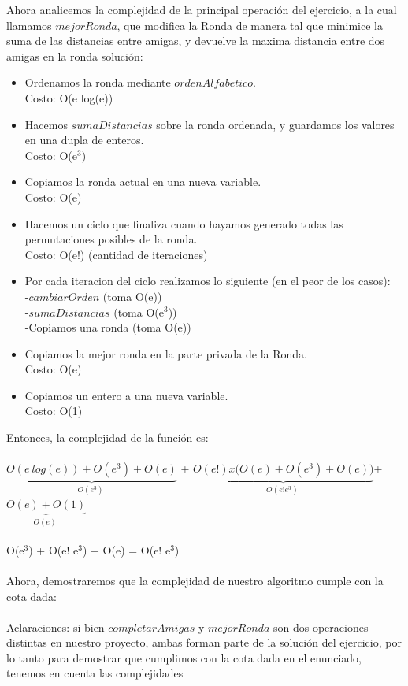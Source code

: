 Ahora analicemos la complejidad de la principal operación del ejercicio, a la cual llamamos $mejorRonda$, que modifica la Ronda de manera
tal que minimice la suma de las distancias entre amigas, y devuelve la maxima distancia entre dos amigas en la ronda solución: 
\begin{itemize}
\item Ordenamos la ronda mediante $ordenAlfabetico$. \\
Costo: O(e log(e))
\item Hacemos $sumaDistancias$ sobre la ronda ordenada, y guardamos los valores en una dupla de enteros.\\
Costo: O(e$^3$)
\item Copiamos la ronda actual en una nueva variable. \\
Costo: O(e)
\item Hacemos un ciclo que finaliza cuando hayamos generado todas las permutaciones posibles de la ronda. \\
Costo: O(e!) (cantidad de iteraciones)
\item Por cada iteracion del ciclo realizamos lo siguiente (en el peor de los casos):\\
-$cambiarOrden$ (toma O(e)) \\
-$sumaDistancias$ (toma O(e$^3$)) \\
-Copiamos una ronda (toma O(e))
\item Copiamos la mejor ronda en la parte privada de la Ronda. \\
Costo: O(e)
\item Copiamos un entero a una nueva variable. \\
Costo: O(1)
\end{itemize}
Entonces, la complejidad de la función es:\\ \\
$\underbrace{O(e \ log(e)) + O(e^3) + O(e)}_{O(e^3)\;}$ + $\underbrace{ O(e!) x \big( O(e) + O(e^3) + O(e) \big) }_{O(e! e^3) \;}$+
$\underbrace {O(e) + O(1)}_{O(e)\;}$ \\ \\
O(e$^3$) + O(e! e$^3$) + O(e) = O(e! e$^3$) \\
\\
Ahora, demostraremos que la complejidad de nuestro algoritmo cumple con la cota dada: \\
\\
Aclaraciones: si bien $completarAmigas$ y $mejorRonda$ son dos operaciones distintas en nuestro proyecto, ambas forman parte de la
solución del ejercicio, por lo tanto para demostrar que cumplimos con la cota dada en el enunciado, tenemos en cuenta las complejidades 
